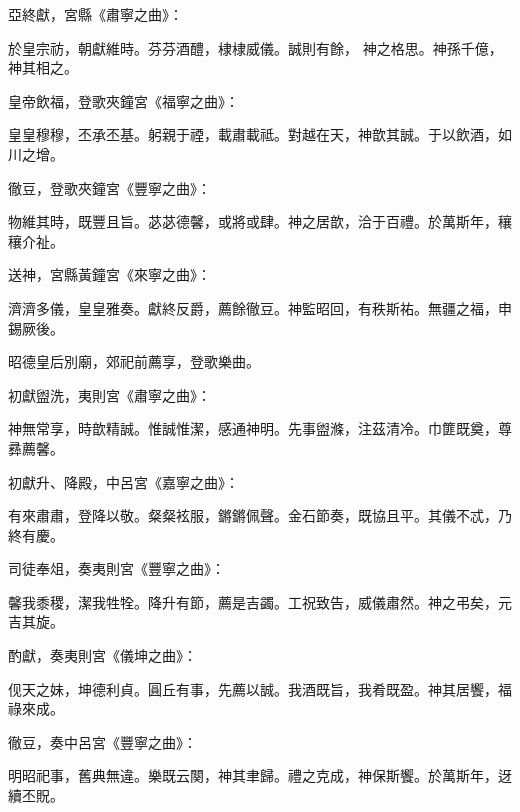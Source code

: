 \begin{pinyinscope}
 亞終獻，宮縣《肅寧之曲》：



 於皇宗祊，朝獻維時。芬芬酒醴，棣棣威儀。誠則有餘，
 神之格思。神孫千億，神其相之。



 皇帝飲福，登歌夾鐘宮《福寧之曲》：



 皇皇穆穆，丕承丕基。躬親于禋，載肅載祗。對越在天，神歆其誠。于以飲酒，如川之增。



 徹豆，登歌夾鐘宮《豐寧之曲》：



 物維其時，既豐且旨。苾苾德馨，或將或肆。神之居歆，洽于百禮。於萬斯年，穰穰介祉。



 送神，宮縣黃鐘宮《來寧之曲》：



 濟濟多儀，皇皇雅奏。獻終反爵，薦餘徹豆。神監昭回，有秩斯祐。無疆之福，申錫厥後。



 昭德皇后別廟，郊祀前薦享，登歌樂曲。



 初獻盥洗，夷則宮《肅寧之曲》：



 神無常享，時歆精誠。惟誠惟潔，感通神明。先事盥滌，注茲清冷。巾篚既奠，尊彞薦馨。



 初獻升、降殿，中呂宮《嘉寧之曲》：



 有來肅肅，登降以敬。粲粲袨服，鏘鏘佩聲。金石節奏，既協且平。其儀不忒，乃終有慶。



 司徒奉俎，奏夷則宮《豐寧之曲》：



 馨我黍稷，潔我牲牷。降升有節，薦是吉蠲。工祝致告，威儀肅然。神之弔矣，元吉其旋。



 酌獻，奏夷則宮《儀坤之曲》：



 伣天之妹，坤德利貞。圓丘有事，先薦以誠。我酒既旨，我肴既盈。神其居饗，福祿來成。



 徹豆，奏中呂宮《豐寧之曲》：



 明昭祀事，舊典無違。樂既云闋，神其聿歸。禮之克成，神保斯饗。於萬斯年，迓續丕貺。




\end{pinyinscope}

